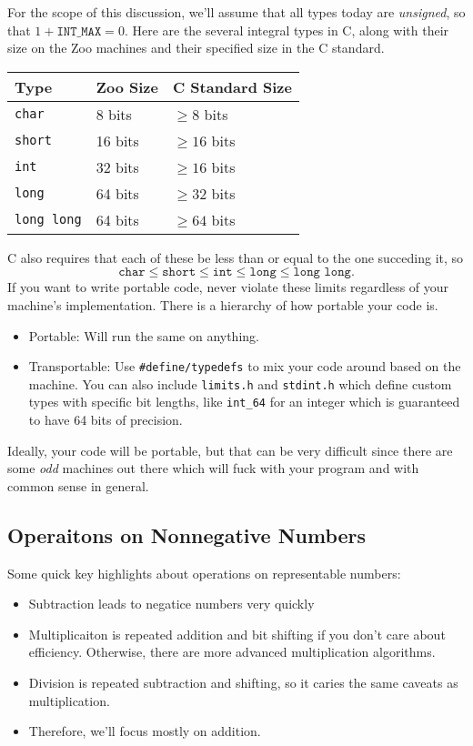 For the scope of this discussion, we'll assume that all types today are \emph{unsigned}, so that $1 + \texttt{INT\_MAX} = 0$.
Here are the several integral types in C, along with their size on the Zoo machines and their specified size in the C standard.

\begin{center}
\begin{tabular}{@{}lll@{}}
\toprule
Type & Zoo Size & C Standard Size \\
\midrule
\texttt{char} & 8 bits & $\geq 8$ bits \\
\texttt{short} & 16 bits & $\geq 16$ bits \\
\texttt{int} & 32 bits & $\geq 16$ bits \\
\texttt{long} & 64 bits & $\geq 32$ bits \\
\texttt{long long} & 64 bits & $\geq 64$ bits \\
\bottomrule
\end{tabular}
\end{center}

C also requires that each of these be less than or equal to the one succeding it, so
\[ \texttt{char} \leq \texttt{short} \leq \texttt{int} \leq \texttt{long} \leq \texttt{long long}. \]
If you want to write portable code, never violate these limits regardless of your machine's implementation.
There is a hierarchy of how portable your code is.
\begin{itemize}
\item Portable: Will run the same on anything.
\item Transportable: Use \texttt{\#define/typedefs} to mix your code around based on the machine. 
You can also include \texttt{limits.h} and \texttt{stdint.h} which define custom types with specific bit lengths, like \texttt{int\_64} for an integer which is guaranteed to have 64 bits of precision.
\end{itemize}
Ideally, your code will be portable, but that can be very difficult since there are some \emph{odd} machines out there which will fuck with your program and with common sense in general.

\subsection*{Operaitons on Nonnegative Numbers}

Some quick key highlights about operations on representable numbers:
\begin{itemize}
\item Subtraction leads to negatice numbers very quickly
\item Multiplicaiton is repeated addition and bit shifting if you don't care about efficiency. Otherwise, there are more advanced multiplication algorithms.
\item Division is repeated subtraction and shifting, so it caries the same caveats as multiplication.
\item Therefore, we'll focus mostly on addition.
\end{itemize}

